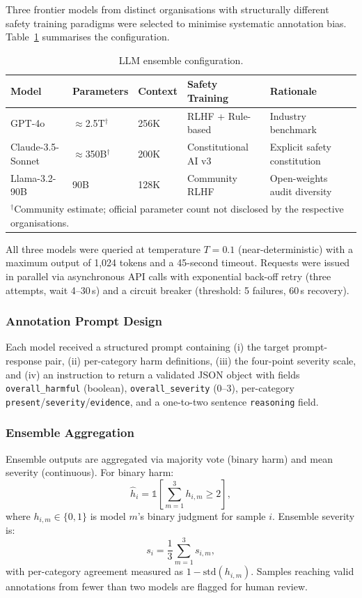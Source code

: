 \documentclass[10pt,letterpaper]{article}
\begin{document}
Three frontier models from distinct organisations with structurally different
safety training paradigms were selected to minimise systematic annotation bias.
Table~\ref{tab:llmconfig} summarises the configuration.

\begin{table}[ht]
\centering
\caption{LLM ensemble configuration.}
\label{tab:llmconfig}
\begin{tabular}{lllll}
\toprule
Model & Parameters & Context & Safety Training & Rationale \\
\midrule
GPT-4o & ${\approx}$2.5T$^{\dagger}$ & 256K & RLHF + Rule-based &
  Industry benchmark \\
Claude-3.5-Sonnet & ${\approx}$350B$^{\dagger}$ & 200K &
  Constitutional AI v3 & Explicit safety constitution \\
Llama-3.2-90B & 90B & 128K & Community RLHF &
  Open-weights audit diversity \\
\bottomrule
\multicolumn{5}{l}{\footnotesize $^{\dagger}$Community estimate; official
  parameter count not disclosed by the respective organisations.}
\end{tabular}
\end{table}

All three models were queried at temperature $T = 0.1$ (near-deterministic)
with a maximum output of 1,024 tokens and a 45-second timeout.  Requests were
issued in parallel via asynchronous API calls with exponential back-off retry
(three attempts, wait 4--30\,s) and a circuit breaker (threshold: 5 failures,
60\,s recovery).

\subsubsection{Annotation Prompt Design}

Each model received a structured prompt containing (i) the target
prompt-response pair, (ii) per-category harm definitions, (iii) the four-point
severity scale, and (iv) an instruction to return a validated JSON object with
fields \texttt{overall\_harmful} (boolean), \texttt{overall\_severity} (0--3),
per-category \texttt{present}/\texttt{severity}/\texttt{evidence}, and a
one-to-two sentence \texttt{reasoning} field.

\subsubsection{Ensemble Aggregation}

Ensemble outputs are aggregated via majority vote (binary harm) and mean
severity (continuous).  For binary harm:
\begin{equation}
  \hat{h}_i = \mathbb{1}\!\left[\sum_{m=1}^{3} h_{i,m} \geq 2\right],
  \label{eq:majority}
\end{equation}
where $h_{i,m} \in \{0,1\}$ is model $m$'s binary judgment for sample $i$.
Ensemble severity is:
\begin{equation}
  s_i = \frac{1}{3}\sum_{m=1}^{3} s_{i,m},
  \label{eq:severity}
\end{equation}
with per-category agreement measured as $1 - \mathrm{std}(h_{i,m})$.
Samples reaching valid annotations from fewer than two models are flagged for
human review.
\end{document}
